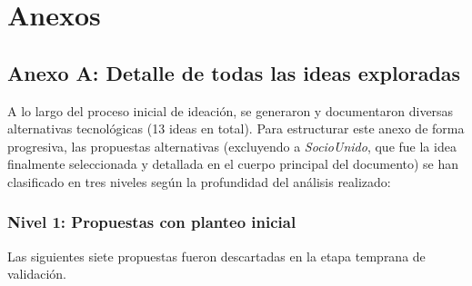 \section{Anexos}

\subsection{Anexo A: Detalle de todas las ideas exploradas}

A lo largo del proceso inicial de ideación, se generaron y documentaron diversas alternativas tecnológicas (13 ideas en total). Para estructurar este anexo de forma progresiva, las propuestas alternativas (excluyendo a \textit{SocioUnido}, que fue la idea finalmente seleccionada y detallada en el cuerpo principal del documento) se han clasificado en tres niveles según la profundidad del análisis realizado:

\subsubsection{Nivel 1: Propuestas con planteo inicial}

Las siguientes siete propuestas fueron descartadas en la etapa temprana de validación.

